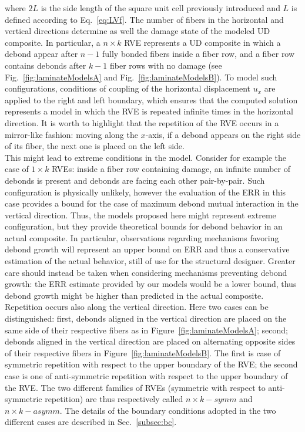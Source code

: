 \documentclass[smallextended]{svjour3}       %
\begin{document}
where $2L$ is the side length of the square unit cell previously introduced and $L$ is defined according to Eq.~\ref{eq:LVf}. The number of fibers in the horizontal and vertical directions determine as well the damage state of the modeled UD composite. In particular, a $n\times k$ RVE represents a UD composite in which a debond appear after $n-1$ fully bonded fibers inside a fiber row, and a fiber row contains debonds after $k-1$ fiber rows with no damage (see Fig.~\ref{fig:laminateModelsA} and Fig.~\ref{fig:laminateModelsB}). To model such configurations, conditions of coupling of the horizontal displacement $u_{x}$ are applied to the right and left boundary, which ensures that the computed solution represents a model in which the RVE is repeated infinite times in the horizontal direction. It is worth to highlight that the repetition of the RVE occurs in a mirror-like fashion: moving along the $x$-axis, if a debond appears on the right side of its fiber, the next one is placed on the left side.\\
This might lead to extreme conditions in the model. Consider for example the case of $1\times k$ RVEs: inside a fiber row containing damage, an infinite number of debonds is present and debonds are facing each other pair-by-pair. Such configuration is physically unlikely, however the evaluation of the ERR in this case provides a bound for the case of maximum debond mutual interaction in the vertical direction. Thus, the models proposed here might represent extreme configuration, but they provide theoretical bounds for debond behavior in an actual composite. In particular, observations regarding mechanisms favoring debond growth will represent an upper bound on ERR and thus a conservative estimation of the actual behavior, still of use for the structural designer. Greater care should instead be taken when considering mechanisms preventing debond growth: the ERR estimate provided by our models would be a lower bound, thus debond growth might be higher than predicted in the actual composite.\\
Repetition occurs also along the vertical direction. Here two cases can be distinguished: first, debonds aligned in the vertical direction are placed on the same side of their respective fibers as in Figure~\ref{fig:laminateModelsA}; second; debonds aligned in the vertical direction are placed on alternating opposite sides of their respective fibers in Figure~\ref{fig:laminateModelsB}. The first is case of symmetric repetition with respect to the upper boundary of the RVE; the second case is one of anti-symmetric repetition with respect to the upper boundary of the RVE. The two different families of RVEs (symmetric with respect to anti-symmetric repetition) are thus respectively called $n\times k-symm$ and $n\times k-asymm$. The details of the boundary conditions adopted in the two different cases are described in Sec.~\ref{subsec:bc}.
\end{document}
